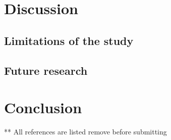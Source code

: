 \documentclass{master_thesis}
\begin{document}
\section{Discussion}
\subsection{Limitations of the study}
\subsection{Future research}
\section{Conclusion}
\pagebreak

** All references are listed remove before submitting
\nocite{*}
\printbibliography
\end{document}
